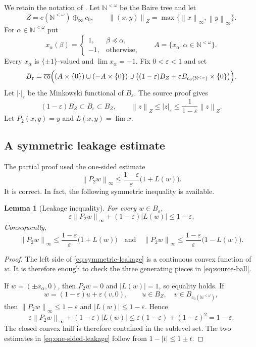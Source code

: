 \documentclass[11pt]{article}
\newtheorem{lemma}[theorem]{Lemma}
\newcommand{\N}{\mathbb N}
\newcommand{\eps}{\varepsilon}
\newcommand{\clco}{\overline{\operatorname{co}}}
\newcommand{\norm}[1]{\left\lVert #1\right\rVert}
\newcommand{\abs}[1]{\left\lvert #1\right\rvert}
\newcommand{\sourceNorm}[1]{\left\lvert #1\right\rvert_{\eps}}
\begin{document}
We retain the notation of \cite[Section~3]{RodriguezRueda2023}.  Let $\N^{<\omega}$ be the Baire tree and let
\[
 Z=c(\N^{<\omega})\oplus_\infty c_0,
 \qquad
 \norm{(x,y)}_Z=\max\{\norm{x}_\infty,\norm{y}_\infty\}.
\]
For $\alpha\in\N^{<\omega}$ put
\[
 x_\alpha(\beta)=
 \begin{cases}
  1,&\beta\preceq\alpha,\\
 -1,&\text{otherwise},
 \end{cases}
 \qquad
 A=\{x_\alpha:\alpha\in\N^{<\omega}\}.
\]
Every $x_\alpha$ is $\{\pm1\}$-valued and $\lim x_\alpha=-1$.  Fix $0<\eps<1$ and set
\begin{equation}
\label{eq:source-ball}
 B_\eps=\clco\Bigl(
 (A\times\{0\})\cup(-A\times\{0\})\cup
 \bigl((1-\eps)B_Z+\eps B_{c_0(\N^{<\omega})}\times\{0\}\bigr)
 \Bigr).
\end{equation}
Let $\sourceNorm{\cdot}$ be the Minkowski functional of $B_\eps$.  The source proof gives
\begin{equation}
\label{eq:norm-comparison}
 (1-\eps)B_Z\subset B_\eps\subset B_Z,
 \qquad
 \norm{z}_Z\le\sourceNorm{z}\le\frac{1}{1-\eps}\norm{z}_Z.
\end{equation}
Let $P_2(x,y)=y$ and $L(x,y)=\lim x$.

\subsection{A symmetric leakage estimate}

The partial proof used the one-sided estimate
\[
 \norm{P_2w}_\infty\le \frac{1-\eps}{\eps}\bigl(1+L(w)\bigr).
\]
It is correct.  In fact, the following symmetric inequality is available.

\begin{lemma}[Leakage inequality]
\label{lem:leakage}
For every $w\in B_\eps$,
\begin{equation}
\label{eq:symmetric-leakage}
 \eps\norm{P_2w}_\infty+(1-\eps)\abs{L(w)}\le 1-\eps.
\end{equation}
Consequently,
\begin{equation}
\label{eq:one-sided-leakage}
 \norm{P_2w}_\infty
 \le \frac{1-\eps}{\eps}\bigl(1+L(w)\bigr)
 \quad\text{and}\quad
 \norm{P_2w}_\infty
 \le \frac{1-\eps}{\eps}\bigl(1-L(w)\bigr).
\end{equation}
\end{lemma}

\begin{proof}
The left side of \eqref{eq:symmetric-leakage} is a continuous convex function of $w$.  It is therefore enough to check the three generating pieces in \eqref{eq:source-ball}.

If $w=(\pm x_\alpha,0)$, then $P_2w=0$ and $\abs{L(w)}=1$, so equality holds.  If
\[
 w=(1-\eps)u+\eps(v,0),
 \qquad u\in B_Z,\quad v\in B_{c_0(\N^{<\omega})},
\]
then $\norm{P_2w}_\infty\le1-\eps$ and $\abs{L(w)}\le1-\eps$.  Hence
\[
 \eps\norm{P_2w}_\infty+(1-\eps)\abs{L(w)}
 \le \eps(1-\eps)+(1-\eps)^2=1-\eps.
\]
The closed convex hull is therefore contained in the sublevel set.  The two estimates in \eqref{eq:one-sided-leakage} follow from $1-\abs{t}\le1\pm t$.
\end{proof}
\end{document}
